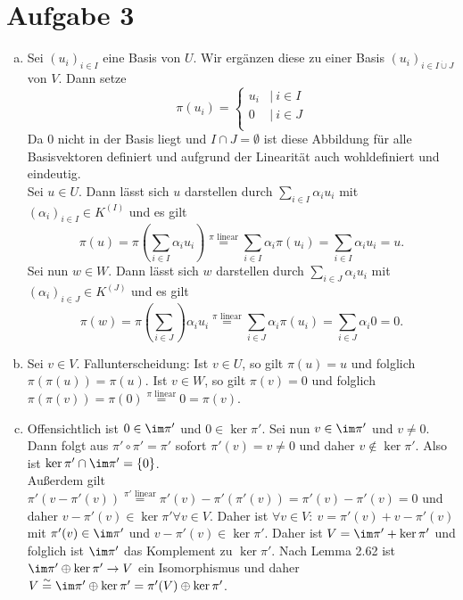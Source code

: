 \documentclass{article}
\begin{document}
\section*{Aufgabe 3}
\begin{enumerate}[(a)]
    \item Sei $(u_i)_{i\in I}$ eine Basis von $U$. Wir ergänzen diese zu einer Basis $(u_i)_{i\in I\dot{\cup}J}$ von $V$. Dann setze
    $$\pi(u_i) = \begin{cases}
        u_i &|\ i\in I\\
        0 &|\ i\in J\\
    \end{cases}$$
    Da $0$ nicht in der Basis liegt und $I\cap J = \emptyset$ ist diese Abbildung für alle Basisvektoren definiert und aufgrund der Linearität auch wohldefiniert und eindeutig.\\
    Sei $u \in U$. Dann lässt sich $u$ darstellen durch $\sum_{i\in I} \alpha_iu_i$ mit $(\alpha_i)_{i\in I}\in K^{(I)}$ und es gilt
    $$ \pi(u) = \pi(\sum_{i\in I} \alpha_iu_i) \overset{\pi \text{ linear}}{=} \sum_{i\in I} \alpha_i \pi(u_i) = \sum_{i\in I} \alpha_i u_i = u.$$
    Sei nun $w\in W$. Dann lässt sich $w$ darstellen durch $\sum_{i\in J} \alpha_iu_i$ mit $(\alpha_i)_{i\in J}\in K^{(J)}$ und es gilt 
    $$\pi(w) = \pi(\sum_{i\in J})\alpha_iu_i \overset{\pi \text{ linear}}{=} \sum_{i\in J} \alpha_i \pi(u_i) = \sum_{i\in J} \alpha_i 0 = 0.$$
    \item Sei $v\in V$. Fallunterscheidung:
    \subitem Ist $v\in U$, so gilt $\pi(u) = u$ und folglich $\pi(\pi(u)) = \pi(u)$.
    \subitem Ist  $v\in W$, so gilt $\pi(v) = 0$ und folglich $\pi(\pi(v)) = \pi(0) \overset{\pi \text{ linear}}{=} 0 = \pi(v)$.
    \item Offensichtlich ist $0\in \im \pi'$ und $0 \in \ker \pi'$.
    Sei nun $v\in \im \pi'$ und $v\neq 0$. Dann folgt aus $\pi' \circ \pi' = \pi'$ sofort $\pi'(v) = v \neq 0$ und daher $v \notin \ker \pi'$. Also ist $\ker \pi' \cap \im \pi' = \{0\}$.\\
    Außerdem gilt $\pi'(v-\pi'(v)) \overset{\pi'\text{ linear}}{=} \pi'(v) - \pi'(\pi'(v)) = \pi'(v) - \pi'(v) = 0$ und daher $v - \pi'(v) \in \ker \pi'\forall v\in V$. Daher ist $\forall v\in V:\ v = \pi'(v) + v - \pi'(v)$ mit $\pi'(v) \in \im \pi'$ und $v - \pi'(v) \in \ker \pi'$. 
    Daher ist $V = \im \pi' + \ker \pi'$ und folglich ist $\im \pi'$ das Komplement zu $\ker \pi'$. Nach Lemma 2.62 ist $\im \pi' \oplus \ker \pi' \to V$ ein Isomorphismus und daher $V \overset{\sim}{=} \im \pi' \oplus \ker \pi' = \pi'(V) \oplus \ker \pi'$.
    \end{enumerate}
\end{document}
